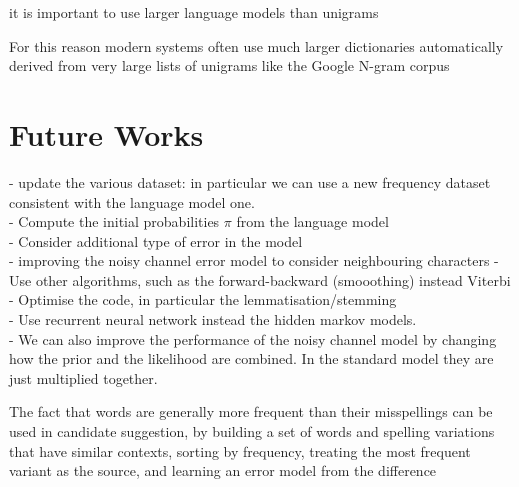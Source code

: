 
it is important to use larger language models than unigrams


For this reason modern systems often use much larger dictionaries automatically derived from very large lists of 
unigrams like the Google N-gram corpus

\section{Future Works}

- update the various dataset: in particular we can use a new frequency dataset consistent with the language model one.\\
- Compute the initial probabilities $\pi$ from the language model\\
- Consider additional type of error in the model\\
- improving the noisy channel error model to consider neighbouring characters
- Use other algorithms, such as the forward-backward (smooothing) instead Viterbi\\
- Optimise the code, in particular the lemmatisation/stemming \\
- Use recurrent neural network instead the hidden markov models.\\
- We can also improve the performance of the noisy channel model by changing how the prior and the likelihood 
are combined. In the standard model they are just multiplied together.

The fact that words are generally more frequent than their misspellings can be used in candidate suggestion, by 
building a set of words and spelling variations that have similar contexts, sorting by frequency, treating the most 
frequent variant as the source, and learning an error model from the difference